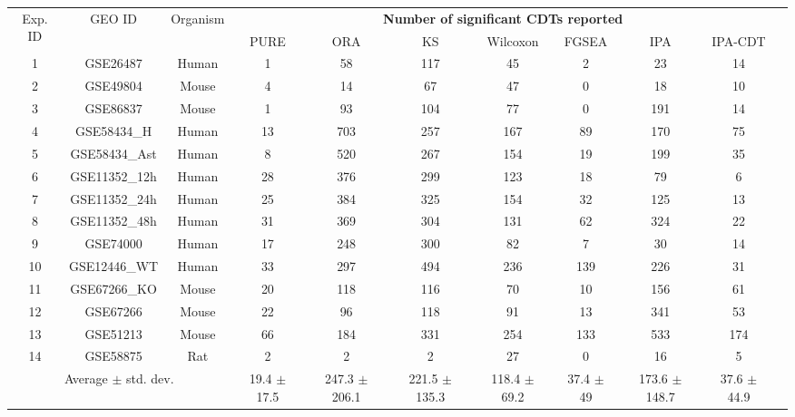 \begin{table}
\begin{center}
\begin{tabular}{ ccc|cccccccc }
\multirow{2}{*}{Exp. ID}& \multirow{2}{*}{GEO ID}& \multirow{2}{*}{Organism}& \multicolumn{7}{c}{\textbf{Number of significant CDTs reported}} \\
& & &   PURE  & ORA & KS  & Wilcoxon & FGSEA & IPA & IPA-CDT\\
\hline
1	& GSE26487& Human &	\cellcolor{green}1	&	58	&	117	&	45	&	\cellcolor{red}2	& 23 &	\cellcolor{cyan}14\\
2	& GSE49804& Mouse	&	\cellcolor{green}4	&	\cellcolor{cyan}14	&	67	&	47	&	\cellcolor{red}0	&	\cellcolor{cyan}18 & \cellcolor{cyan}10\\
3	& GSE86837& Mouse	&	\cellcolor{green}1	&	93	&	104	&	77	&	\cellcolor{red}0	& \cellcolor{red}191 &	\cellcolor{red}14\\
4	& GSE58434\_H& Human &		\cellcolor{cyan}13	&	703	&	257	&	167	&	\cellcolor{red}89 &	170 &	75\\
5	& GSE58434\_Ast& Human &	\cellcolor{green}8	&	520	&	267	&	\cellcolor{red}154	&	\cellcolor{red}19	& 199 &	35\\
6	& GSE11352\_12h & Human	&	28	&	376	&	299	&	\cellcolor{red}123	&	\cellcolor{cyan}18	& 79&	\cellcolor{green}6\\
7	& GSE11352\_24h & Human	&	25	&	384	&	325	&	\cellcolor{red}154	&	32	&125 &	\cellcolor{cyan}13\\
8	& GSE11352\_48h & Human	&	31	&	369	&	304	&	\cellcolor{red}131	&	62	&324 & 	22\\
9	& GSE74000 & Human	&	\cellcolor{cyan}17	&	248	&	300	&	82	&	\cellcolor{red}7	&	\cellcolor{red}30 & \cellcolor{red}14\\
10	& GSE12446\_WT & Human	&	33	&	297	&	494	&	\cellcolor{red}236	&	139	&	226 & 31\\
11	& GSE67266\_KO	& Mouse	&	\cellcolor{cyan}20	&	118	&	116	&	70	&	\cellcolor{cyan}10	&	156& 61\\
12	& GSE67266&	Mouse	&	22	&	96	&	118	&	91	&	\cellcolor{cyan}13	& 341&	53\\
13	& GSE51213	& Mouse	&	66	&	184	&	331	&	254	&	133	&	533& 174\\
14	& GSE58875	& Rat 	&	\cellcolor{green}2	&	\cellcolor{green}2	&	\cellcolor{green}2	&	27	&	\cellcolor{red}0	&\cellcolor{red}16&	\cellcolor{red}5\\
\hline
\multicolumn{3}{c}{Average $\pm$ std. dev. }& \makecell{19.4 \\$\pm$ 17.5 } & \makecell{247.3 \\$\pm$ 206.1} & \makecell{221.5 \\$\pm$ 135.3} & \makecell{118.4 \\$\pm$  69.2} & \makecell{37.4 \\$\pm$ 49} & \makecell{173.6 \\$\pm$ 148.7} & \makecell{37.6 \\$\pm$ 44.9} \\ \hline \hline
 
\end{tabular}
\end{center}
\end{table}


